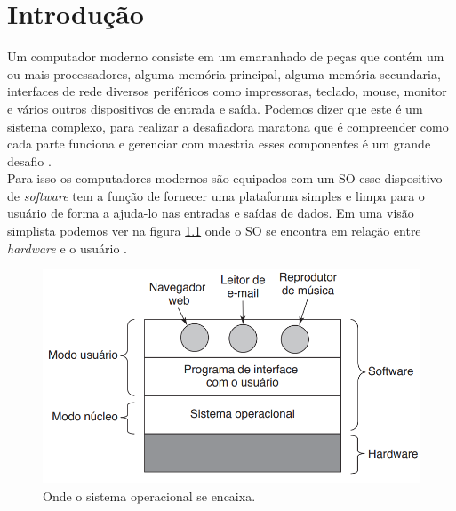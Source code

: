 
\chapter[Introdução]{Introdução}

Um computador moderno consiste em um emaranhado de peças que contém um ou mais processadores, alguma memória principal, alguma memória secundaria, interfaces de rede diversos periféricos como impressoras, teclado, mouse, monitor e vários outros dispositivos de entrada e saída. Podemos dizer que este é um sistema complexo, para realizar a desafiadora maratona que é compreender como cada parte funciona e gerenciar com maestria esses componentes é um grande desafio \cite{Tanenbaum2016}.\\
Para isso os computadores modernos são equipados com um SO esse dispositivo de \emph{software} tem a função de fornecer uma plataforma simples e limpa para o usuário de forma a ajuda-lo nas entradas e saídas de dados. Em uma visão simplista podemos ver na figura \ref{fig:figura1} onde o SO se encontra em relação entre \emph{hardware} e o usuário \cite{Tanenbaum2016}. 

\begin{figure}[htpb]
    \centering
   \includegraphics[scale=.6]{imagens/figura1.png}
   \caption{Onde o sistema operacional se encaixa. \cite{Tanenbaum2016}}
   \label{fig:figura1}
\end{figure}

